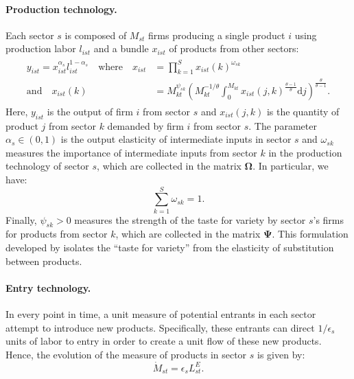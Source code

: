 \documentclass[12pt]{article}
\begin{document}
\paragraph{Production technology.} Each sector $s$ is composed of $M_{st}$ firms producing a single product $i$ using production labor $l_{ist}$ and a bundle $x_{ist}$ of products from other sectors:
\begin{align}
    \begin{split}
    y_{ist} = x_{ist}^{\alpha_s} l_{ist}^{1 - \alpha_s} \quad \text{where} \quad x_{ist} &= \prod_{k = 1}^S x_{ist}(k)^{\omega_{sk}} \\
    \text{and} \quad x_{ist}(k) &= M_{kt}^{\psi_{sk}} \left(M_{kt}^{-1 / \theta} \int_0^{M_{kt}} x_{ist}(j, k)^{\frac{\theta - 1}{\theta}} \mathrm{d}j\right)^{\frac{\theta}{\theta - 1}}. \label{eq:production technology}
    \end{split}
\end{align}
Here, $y_{ist}$ is the output of firm $i$ from sector $s$ and $x_{ist}(j, k)$ is the quantity of product $j$ from sector $k$ demanded by firm $i$ from sector $s$. The parameter $\alpha_s \in (0, 1)$ is the output elasticity of intermediate inputs in sector $s$ and $\omega_{sk}$ measures the importance of intermediate inputs from sector $k$ in the production technology of sector $s$, which are collected in the matrix $\bm{\Omega}$. In particular, we have:
\begin{equation*}
    \sum_{k = 1}^S \omega_{sk} = 1.
\end{equation*}
Finally, $\psi_{sk} > 0$ measures the strength of the taste for variety by sector $s$'s firms for products from sector $k$, which are collected in the matrix $\bm{\Psi}$. This formulation developed by \citet{Benassy_1996} isolates the ``taste for variety'' from the elasticity of substitution between products.

\paragraph{Entry technology.} In every point in time, a unit measure of potential entrants in each sector attempt to introduce new products. Specifically, these entrants can direct $1 / \epsilon_s$ units of labor to entry in order to create a unit flow of these new products. Hence, the evolution of the measure of products in sector $s$ is given by:
\begin{equation}
    \dot{M}_{st} = \epsilon_s L_{st}^E. \label{eq:entry technology}
\end{equation}
\end{document}
